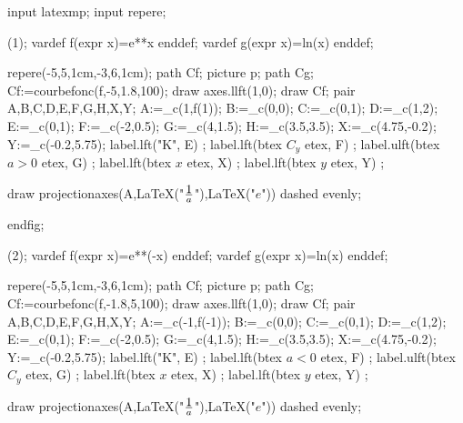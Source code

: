 input latexmp;
input repere;


\beginfig(1);
vardef f(expr x)=e**x enddef;
vardef g(expr x)=ln(x) enddef;


repere(-5,5,1cm,-3,6,1cm);
 path Cf; picture p; path Cg;
 Cf:=courbefonc(f,-5,1.8,100);
 draw axes.llft(1,0);
 draw Cf;
 pair A,B,C,D,E,F,G,H,X,Y;
 A:=_c(1,f(1));
 B:=_c(0,0);
 C:=_c(0,1);
 D:=_c(1,2);
 E:=_c(0,1);
 F:=_c(-2,0.5);
 G:=_c(4,1.5);
 H:=_c(3.5,3.5);
 X:=_c(4.75,-0.2);
 Y:=_c(-0.2,5.75);
 label.lft("K", E) ;
 label.lft(btex $ C_{y} $ etex, F) ;
  label.ulft(btex $a>0$ etex, G) ;
    label.lft(btex $x$ etex, X) ;
    label.lft(btex $y$ etex, Y) ;


 draw projectionaxes(A,LaTeX("$\displaystyle 1 \over a$"),LaTeX("$e$")) dashed evenly;
 
endfig;

\beginfig(2);
vardef f(expr x)=e**(-x) enddef;
vardef g(expr x)=ln(x) enddef;


repere(-5,5,1cm,-3,6,1cm);
 path Cf; picture p; path Cg;
 Cf:=courbefonc(f,-1.8,5,100);
 draw axes.llft(1,0);
 draw Cf;
 pair A,B,C,D,E,F,G,H,X,Y;
 A:=_c(-1,f(-1));
 B:=_c(0,0);
 C:=_c(0,1);
 D:=_c(1,2);
 E:=_c(0,1);
 F:=_c(-2,0.5);
 G:=_c(4,1.5);
 H:=_c(3.5,3.5);
 X:=_c(4.75,-0.2);
 Y:=_c(-0.2,5.75);
 label.lft("K", E) ;
 label.lft(btex $ a<0$ etex, F) ;
  label.ulft(btex $C_y$ etex, G) ;
    label.lft(btex $x$ etex, X) ;
    label.lft(btex $y$ etex, Y) ;


 draw projectionaxes(A,LaTeX("$\displaystyle 1 \over a$"),LaTeX("$e$")) dashed evenly;
 
